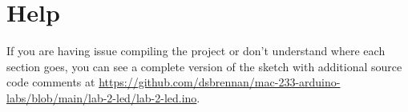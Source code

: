 \documentclass[11pt,a4paper]{article}
\begin{document}
\section*{Help}
If you are having issue compiling the project or don't understand where each section goes, you can see a complete version of the sketch with additional source code comments at \url{https://github.com/dsbrennan/mac-233-arduino-labs/blob/main/lab-2-led/lab-2-led.ino}.

\vspace{2em}

\begin{center}
\end{center}
\end{document}
